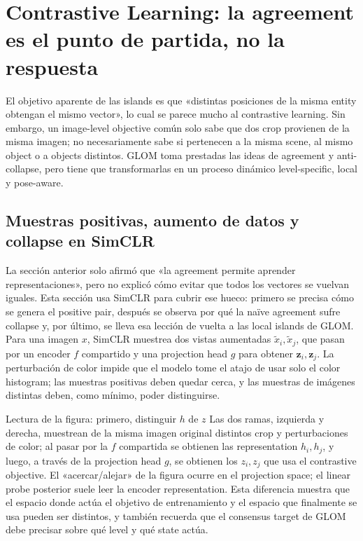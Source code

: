 \section{Contrastive Learning: la agreement es el punto de partida, no la respuesta}

El objetivo aparente de las islands es que «distintas posiciones de la misma entity obtengan el mismo vector», lo cual se parece mucho al contrastive learning. Sin embargo, un image-level objective común solo sabe que dos crop provienen de la misma imagen; no necesariamente sabe si pertenecen a la misma scene, al mismo object o a objects distintos. GLOM toma prestadas las ideas de agreement y anti-collapse, pero tiene que transformarlas en un proceso dinámico level-specific, local y pose-aware.


\subsection{Muestras positivas, aumento de datos y collapse en SimCLR}

La sección anterior solo afirmó que «la agreement permite aprender representaciones», pero no explicó cómo evitar que todos los vectores se vuelvan iguales. Esta sección usa SimCLR para cubrir ese hueco: primero se precisa cómo se genera el positive pair, después se observa por qué la naïve agreement sufre collapse y, por último, se lleva esa lección de vuelta a las local islands de GLOM. Para una imagen $x$, SimCLR muestrea dos vistas aumentadas $\tilde x_i,\tilde x_j$, que pasan por un encoder $f$ compartido y una projection head $g$ para obtener $\mathbf z_i,\mathbf z_j$. La perturbación de color impide que el modelo tome el atajo de usar solo el color histogram; las muestras positivas deben quedar cerca, y las muestras de imágenes distintas deben, como mínimo, poder distinguirse.


\begin{knowledgebox}{Lectura de la figura: primero, distinguir $h$ de $z$}
Las dos ramas, izquierda y derecha, muestrean de la misma imagen original distintos crop y perturbaciones de color; al pasar por la $f$ compartida se obtienen las representation $h_i,h_j$, y luego, a través de la projection head $g$, se obtienen los $z_i,z_j$ que usa el contrastive objective. El «acercar/alejar» de la figura ocurre en el projection space; el linear probe posterior suele leer la encoder representation. Esta diferencia muestra que el espacio donde actúa el objetivo de entrenamiento y el espacio que finalmente se usa pueden ser distintos, y también recuerda que el consensus target de GLOM debe precisar sobre qué level y qué state actúa.
\end{knowledgebox}

